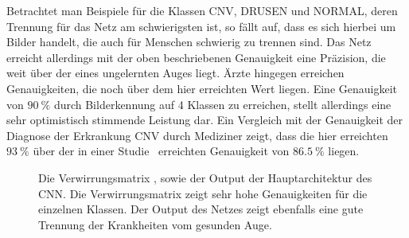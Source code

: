 %
Betrachtet man Beispiele für die Klassen CNV, DRUSEN und NORMAL, deren
Trennung für das Netz am schwierigsten ist, so fällt auf, dass es sich hierbei
um Bilder handelt, die auch für Menschen schwierig zu trennen sind. Das Netz
erreicht allerdings mit der oben beschriebenen Genauigkeit eine Präzision, die
weit über der eines ungelernten Auges liegt. Ärzte hingegen erreichen
Genauigkeiten, die noch über dem hier erreichten Wert liegen.
Eine Genauigkeit von $\SI{90}{\percent}$ durch Bilderkennung auf 4 Klassen zu
erreichen, stellt allerdings eine sehr optimistisch stimmende Leistung dar.
Ein Vergleich mit der Genauigkeit der Diagnose der Erkrankung CNV durch
Mediziner zeigt, dass die hier erreichten $\SI{93}{\percent}$ über der in einer
Studie~\cite{CNV} erreichten Genauigkeit von $\SI{86.5}{\percent}$ liegen.
%
\begin{figure}[h!]
  \renewcommand{\baselinestretch}{1.0}
  \caption{Die Verwirrungsmatrix \protect{}, sowie der Output \protect{} der Hauptarchitektur des CNN. Die Verwirrungsmatrix zeigt sehr hohe Genauigkeiten für die einzelnen Klassen. Der Output des Netzes zeigt ebenfalls eine gute Trennung der Krankheiten vom gesunden Auge.}
  \renewcommand{\baselinestretch}{1.5}
  \label{fig:erg}
\end{figure}
